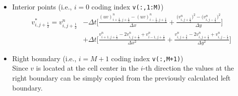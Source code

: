\begin{itemize}
\begin{subequations}
            \label{eq:v-star-left-boundary}
        \end{subequations}
    \vspace{0.1in}
    \item Interior points (i.e., $i=0$ coding index \texttt{v(:,1:M)})
        \begin{subequations}
            \begin{equation}
                \begin{aligned}
                    v^{\ast}_{i,j+\frac{1}{2}} = v^{n}_{i,j+ \frac{1}{2}} & -  \Delta t\Bigg[ 
                    \frac{
                        \left(uv\right)^{n}_{i+\frac{1}{2},j+\frac{1}{2}} - \left(uv\right)^{n}_{i-\frac{1}{2},j+\frac{1}{2}}
                    }{\Delta x} +
                    \frac{
                        \big(v^{n}_{i,j+\frac{1}{2}}\big)^{2} - \big(v^{n}_{i,j-\frac{1}{2}}\big)^{2}
                    }{\Delta y}
                    \Bigg]\\
                    & + \Delta t \Bigg[
                        \frac{
                            v^{n}_{i+1,j+\frac{1}{2}} - 2v^{n}_{i,j+\frac{1}{2}} + v^{n}_{i-1, j+\frac{1}{2}}
                        }{\Delta x^{2}}
                     + 
                        \frac{
                            v^{n}_{i,j+\frac{3}{2}} - 2v^{n}_{i,j+\frac{1}{2}} + v^{n}_{i,j-\frac{1}{2}}
                        }{\Delta y^{2}}
                        \Bigg]
                \end{aligned}
            \end{equation}
            \label{eq:v-star-interior-boundary}
        \end{subequations}
    \vspace{0.1in}
\item Right boundary (i.e., $i=M+1$ coding index \texttt{v(:,M+1)})\\

    Since $v$ is located at the cell center in the $i\text{-th}$ direction 
    the values at the right boundary can be simply copied from the 
    previously calculated left boundary.
        
\end{itemize}


